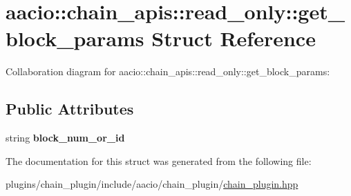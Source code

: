 \hypertarget{structaacio_1_1chain__apis_1_1read__only_1_1get__block__params}{}\section{aacio\+:\+:chain\+\_\+apis\+:\+:read\+\_\+only\+:\+:get\+\_\+block\+\_\+params Struct Reference}
\label{structaacio_1_1chain__apis_1_1read__only_1_1get__block__params}


Collaboration diagram for aacio\+:\+:chain\+\_\+apis\+:\+:read\+\_\+only\+:\+:get\+\_\+block\+\_\+params\+:
\subsection*{Public Attributes}
\begin{DoxyCompactItemize}
\item 
\mbox{\label{structaacio_1_1chain__apis_1_1read__only_1_1get__block__params_ad55f809a2dbe217f5ab79f8d9d8f6680}} 
string {\bfseries block\+\_\+num\+\_\+or\+\_\+id}
\end{DoxyCompactItemize}


The documentation for this struct was generated from the following file\+:\begin{DoxyCompactItemize}
\item 
plugins/chain\+\_\+plugin/include/aacio/chain\+\_\+plugin/\mbox{\hyperlink{chain__plugin_8hpp}{chain\+\_\+plugin.\+hpp}}\end{DoxyCompactItemize}

